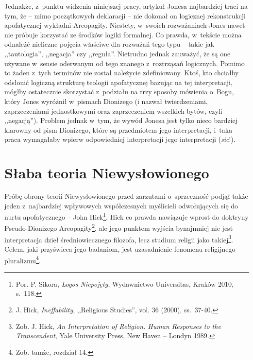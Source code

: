 Jednakże, z~punktu widzenia niniejszej pracy, artykuł Jonesa najbardziej traci na tym, że -- mimo początkowych deklaracji -- nie dokonał on logicznej rekonstrukcji apofatycznej wykładni Areopagity. Niestety, w~swoich rozważaniach Jones nawet nie próbuje korzystać ze środków logiki formalnej. Co prawda, w~tekście można odnaleźć nieliczne pojęcia właściwe dla rozważań tego typu -- takie jak ,,tautologia'', ,,negacja'' czy ,,reguła''. Nietrudno jednak zauważyć, że są one używane w~sensie
oderwanym
od tego znanego z~roztrząsań logicznych. Pomimo to żaden z~tych terminów nie został należycie zdefiniowany. Ktoś, kto chciałby odsłonić logiczną strukturę teologii apofatycznej bazując na tej interpretacji, mógłby ostatecznie skorzystać z~podziału na trzy sposoby mówienia o~Bogu, który Jones wyróżnił w~pismach Dionizego (i nazwał twierdzeniami, zaprzeczeniami jednostkowymi oraz zaprzeczeniem wszelkich bytów, czyli ,,negacją''). Problem jednak w~tym, że wywód Jonesa jest tylko nieco bardziej klarowny od pism Dionizego, które są przedmiotem jego interpretacji, i~taka praca wymagałaby wpierw odpowiedniej interpretacji jego interpretacji (\textit{sic}!).


\chapter{Słaba teoria Niewysłowionego}\label{sil-slabatn}

Próbę obrony teorii Niewysłowionego przed zarzutami o~sprzeczność podjął także jeden z~najbardziej wpływowych współczesnych myślicieli odwołujących się do nurtu apofatycznego -- John Hick\footnote{Por. P. Sikora, \textit{Logos Niepojęty}, Wydawnictwo Universitas, Kraków 2010, s.~118.}. Hick co prawda nawiązuje wprost do doktryny Pseudo-Dionizego Areopagity\footnote{J. Hick, \textit{Ineffability}, ,,Religious Studies'', vol. 36 (2000), ss.~37-40.}, ale jego punktem wyjścia bynajmniej nie jest interpretacja dzieł średniowiecznego filozofa, lecz studium religii jako takiej\footnote{Zob. J. Hick, \textit{An Interpretation of Religion. Human Responses to the Transcendent}, Yale University Press, New Haven -- Londyn 1989.}. Celem, jaki przyświeca jego badaniom, jest uzasadnienie fenomenu religijnego pluralizmu\footnote{Zob. tamże, rozdział 14.}.

